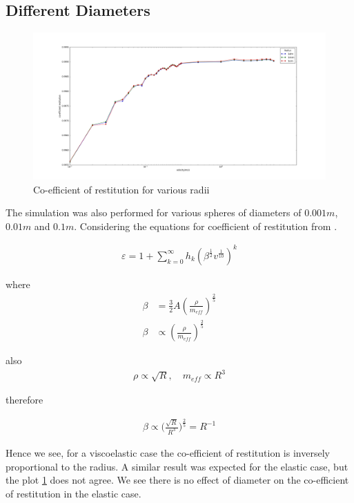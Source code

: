 
\subsection{Different Diameters}

\begin{figure}[H]
\includegraphics[width=1.0\textwidth]{../images/parametricStudy/CORvsVELdiffDAI.png}
\caption{Co-efficient of restitution for various radii}
\label{fig:CORDiffDia}
\end{figure}

The simulation was also performed for various spheres of diameters of $0.001m$, $0.01m$ and $0.1m$. Considering the equations for coefficient of restitution from \citep{muller} .

\begin{align*}
\varepsilon = 1+ \sum_{k=0}^{\infty} h_{k}(\beta^{\frac{1}{2}} v^{\frac{1}{10}})^{k} 
\end{align*}

where
\begin{align*}
\beta &= \frac{3}{2} A (\frac{\rho}{m_{eff}})^{\frac{2}{5}} \\
\beta &\propto (\frac{\rho}{m_{eff}})^{\frac{2}{5}}
\end{align*}

also 
\begin{align*}
\rho \propto \sqrt{R}, \quad m_{eff} \propto R^{3}
\end{align*}

therefore

\begin{align*}
\beta \propto \Big( \frac{\sqrt{R}}{R^{3}} \Big)^{\frac{2}{5}} = R^{-1}
\end{align*}

Hence we see, for a viscoelastic case the co-efficient of restitution is inversely proportional to the radius. A similar result was expected for the elastic case, but the plot \ref{fig:CORDiffDia} does not agree. We see there is no effect of diameter on the co-efficient of restitution in the elastic case.



